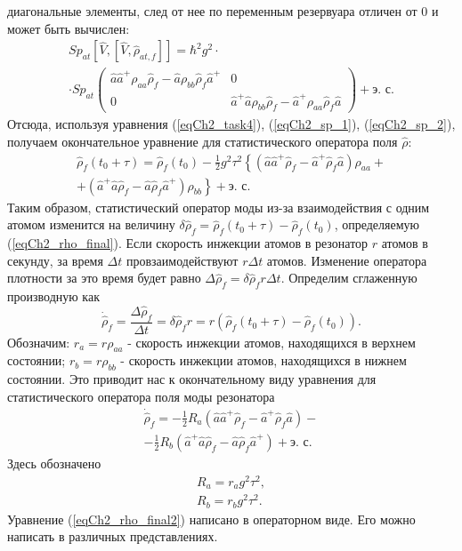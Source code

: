диагональные элементы, след от нее по переменным резервуара отличен от 
0  и может быть вычислен: 
\begin{eqnarray}
Sp_{at}\left[\hat{V},\left[\hat{V}, \hat{\rho}_{at, f}\right] \right]
= \hbar^2 g^2 \cdot
\nonumber \\
\cdot Sp_{at}
\left(
\begin{array} {cc}
\hat{a} \hat{a}^{+}\rho_{aa} \hat{\rho}_{f} -
\hat{a}\rho_{bb} \hat{\rho}_{f}\hat{a}^{+}  & 0
\\
0 & 
\hat{a}^{+} \hat{a}\rho_{bb} \hat{\rho}_{f} -
\hat{a}^{+}\rho_{aa} \hat{\rho}_{f}\hat{a} 
\end{array}
\right) + \mbox{э. с.} 
\label{eqCh2_sp_2}
\end{eqnarray}
Отсюда, используя уравнения (\ref{eqCh2_task4}),
(\ref{eqCh2_sp_1}), (\ref{eqCh2_sp_2}), получаем окончательное
уравнение для статистического оператора поля  $\hat{\rho}$:  
\begin{eqnarray}
\hat{\rho}_{f}\left(t_0 + \tau\right) =
\hat{\rho}_{f}\left(t_0\right) - \frac{1}{2}g^2 \tau^2
\left\{
\left(\hat{a}\hat{a}^{+}\hat{\rho}_{f} - 
\hat{a}^{+}\hat{\rho}_{f}\hat{a}
\right)\rho_{aa} +
\right.
\nonumber \\
\left.
+
\left(\hat{a}^{+}\hat{a}\hat{\rho}_{f} - 
\hat{a}\hat{\rho}_{f}\hat{a}^{+}
\right)\rho_{bb}
\right\} + \mbox{э. с.}
\label{eqCh2_rho_final}
\end{eqnarray}
Таким образом, статистический оператор моды из-за взаимодействия с
одним атомом изменится на величину 
\(
\delta\hat{\rho}_{f}=
\hat{\rho}_{f}\left(t_0 + \tau\right) -
\hat{\rho}_{f}\left(t_0\right)
\), определяемую (\ref{eqCh2_rho_final}). Если скорость инжекции
атомов в резонатор $r$  атомов в секунду, за время  $\Delta t$
провзаимодействуют  $r \Delta t$  атомов. Изменение оператора
плотности за это  время будет равно 
$\Delta \hat{\rho}_{f} = \delta\hat{\rho}_{f}r \Delta t$. Определим сглаженную
производную как 
\[
\dot{\hat{\rho}}_{f} = \frac{\Delta \hat{\rho}_{f}}{\Delta t} = 
\delta\hat{\rho}_{f} r = r 
\left(
\hat{\rho}_{f}\left(t_0 + \tau\right) -
\hat{\rho}_{f}\left(t_0\right)
\right).
\]
Обозначим: $r_a = r \rho_{aa}$ - скорость инжекции атомов, находящихся
в верхнем состоянии; $r_b = r \rho_{bb}$ - скорость инжекции атомов,
находящихся в нижнем состоянии. Это приводит нас к окончательному виду
уравнения для статистического оператора поля моды резонатора 
\begin{eqnarray}
\dot{\hat{\rho}}_{f} =
- \frac{1}{2}R_a
\left(\hat{a}\hat{a}^{+}\hat{\rho}_{f} - 
\hat{a}^{+}\hat{\rho}_{f}\hat{a}
\right)
- 
\nonumber \\
- \frac{1}{2}R_b
\left(\hat{a}^{+}\hat{a}\hat{\rho}_{f} - 
\hat{a}\hat{\rho}_{f}\hat{a}^{+}
\right)
 + \mbox{э. с.}
\label{eqCh2_rho_final2}
\end{eqnarray}
Здесь обозначено 
\begin{eqnarray}
R_a=r_a g^2\tau^2,
\nonumber \\
R_b=r_b g^2\tau^2.
\label{eqCh2_RaRbDefenition}
\end{eqnarray}
Уравнение
(\ref{eqCh2_rho_final2}) написано в операторном виде. Его можно
написать в различных представлениях.   
